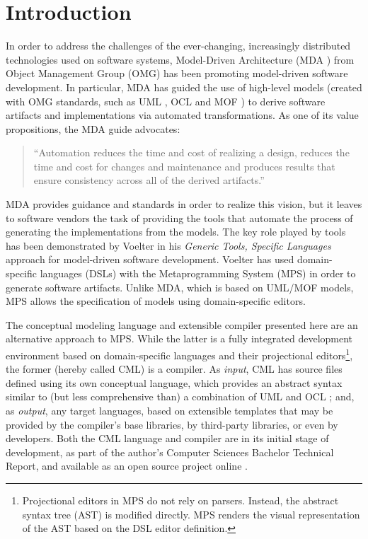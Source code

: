 \section{Introduction}
%
In order to address the challenges of the ever-changing,
increasingly distributed technologies used on software systems,
Model-Driven Architecture (MDA \cite{mda}) from Object Management Group (OMG)
has been promoting model-driven software development.
In particular, MDA has guided the use of high-level models
(created with OMG standards, such as UML \cite{uml}, OCL \cite{ocl} and MOF \cite{mof})
to derive software artifacts and implementations via automated transformations.
As one of its value propositions, the MDA guide \cite{mda} advocates:

\begin{quote}``Automation reduces the time and cost of realizing a design,
reduces the time and cost for changes and maintenance and produces results that ensure consistency across all of the derived artifacts.''\end{quote}

MDA provides guidance and standards in order to realize this vision,
but it leaves to software vendors the task of providing the tools
that automate the process of generating the implementations from the models.
The key role played by tools has been demonstrated by Voelter \cite{voelter}
in his \emph{Generic Tools, Specific Languages} approach for model-driven software development.
Voelter \cite{voelter} has used domain-specific languages (DSLs) with the Metaprogramming System (MPS)
in order to generate software artifacts.
Unlike MDA, which is based on UML/MOF models,
MPS allows the specification of models using domain-specific editors.

The conceptual modeling language and extensible compiler presented here are an alternative approach to MPS.
While the latter is a fully integrated development environment
based on domain-specific languages and their projectional editors\footnote{Projectional
editors in MPS do not rely on parsers.
Instead, the abstract syntax tree (AST) is modified directly.
MPS renders the visual representation of the AST based on the DSL editor definition.},
the former (hereby called CML) is a compiler.
As \emph{input}, CML has source files defined using its own conceptual language,
which provides an abstract syntax similar to (but less comprehensive than)
a combination of UML \cite{uml} and OCL \cite{ocl};
and, as \emph{output}, any target languages,
based on extensible templates that may be provided by the compiler's base libraries,
by third-party libraries, or even by developers.
Both the CML language and compiler are in its initial stage of development,
as part of the author's Computer Sciences Bachelor Technical Report,
and available as an open source project online \cite{cml-repo}.

